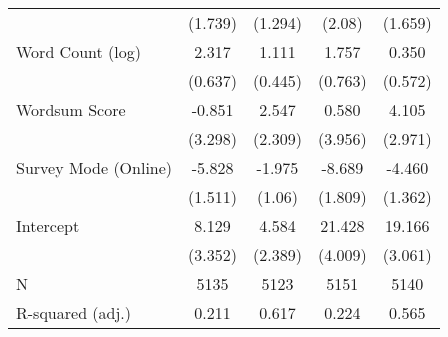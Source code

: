 \begin{table}[h]
\begin{tabular}{lcccc}
   & (1.739) & (1.294) & (2.08) & (1.659) \\ 
  Word Count (log) &   2.317 &   1.111 &   1.757 &   0.350 \\ 
   & (0.637) & (0.445) & (0.763) & (0.572) \\ 
  Wordsum Score &  -0.851 &   2.547 &   0.580 &   4.105 \\ 
   & (3.298) & (2.309) & (3.956) & (2.971) \\ 
  Survey Mode (Online) &  -5.828 &  -1.975 &  -8.689 &  -4.460 \\ 
   & (1.511) & (1.06) & (1.809) & (1.362) \\ 
  Intercept &   8.129 &   4.584 &  21.428 &  19.166 \\ 
   & (3.352) & (2.389) & (4.009) & (3.061) \\ 
   \hline
N & 5135 & 5123 & 5151 & 5140 \\ 
  R-squared (adj.) & 0.211 & 0.617 & 0.224 & 0.565 \\ 
   \hline
\end{tabular}
\endgroup
\end{table}
